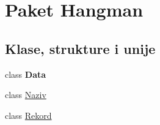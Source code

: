 \hypertarget{namespaceHangman}{}\section{Paket Hangman}
\label{namespaceHangman}
\subsection*{Klase, strukture i unije}
\begin{DoxyCompactItemize}
\item 
class {\bfseries Data}
\item 
class \hyperlink{classHangman_1_1Naziv}{Naziv}
\item 
class \hyperlink{classHangman_1_1Rekord}{Rekord}
\end{DoxyCompactItemize}
